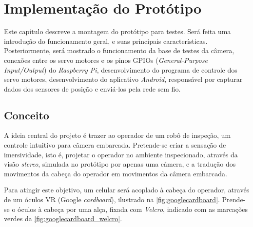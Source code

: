 
\chapter{Implementação do Protótipo}
\label{chap:prototipo}

Este capítulo descreve a montagem do protótipo para testes. Será feita uma introdução do funcionamento geral, e suas principais características. Posteriormente, será mostrado o funcionamento da base de testes da câmera, conexões entre os servo motores e os pinos GPIOs (\textit{General-Purpose Input/Output}) do \textit{Raspberry Pi}, desenvolvimento do programa de controle dos servo motores, desenvolvimento do aplicativo \textit{Android}, responsável por capturar dados dos sensores de posição e enviá-los pela rede sem fio.

\section{Conceito}
\label{sec:conceito}

A ideia central do projeto é trazer ao operador de um robô de inspeção, um controle intuitivo para câmera embarcada. Pretende-se criar a sensação de imersividade, isto é, projetar o operador no ambiente inspecionado, através da visão \textit{stereo}, simulada no protótipo por apenas uma câmera, e a tradução dos movimentos da cabeça do operador em movimentos da câmera embarcada.\par
Para atingir este objetivo, um celular será acoplado à cabeça do operador, através de um óculos VR (Google \textit{cardboard}), ilustrado na \autoref{fig:googlecardboard}. Prende-se o óculos à cabeça por uma alça, fixada com \textit{Velcro}, indicado com as marcações verdes da \autoref{fig:googlecardboard_welcro}. \par 

